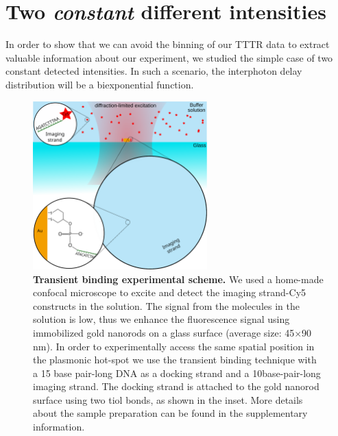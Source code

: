 \section{Two \textit{constant} different intensities}

In order to show that we can avoid the binning of our TTTR data to 
extract valuable information about our experiment, we studied the 
simple case of two constant detected intensities. In such a scenario, 
the interphoton delay distribution will be a biexponential function.

\begin{figure}
\centering
\includegraphics[width=0.6\textwidth]{Transient_scheme}%
\caption{\textbf{Transient binding experimental scheme.} We used a 
home-made confocal microscope to excite and detect the imaging 
strand-Cy5 constructs in the solution. The signal from the molecules 
in the solution is low, thus we enhance the fluorescence signal using 
immobilized gold nanorods on a glass surface (average size: 45$\times$90 nm). 
In order to experimentally access the same spatial position in the plasmonic 
hot-spot we use the transient binding technique with a 15 base pair-long 
DNA as a docking strand and a 10base-pair-long imaging strand. 
The docking strand is attached to the gold nanorod surface using 
two tiol bonds, as shown in the inset. More details about the sample 
preparation can be found in the supplementary information. 
\label{fg:transient}}
\end{figure}

